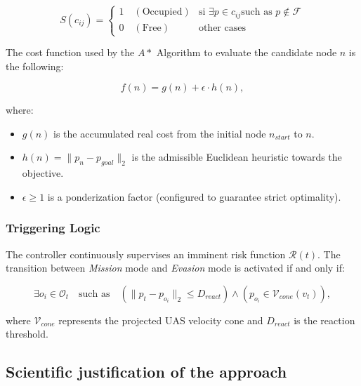 \documentclass[a4paper, 11pt]{article}
\begin{document}
\begin{equation}
    S(c_{ij}) = 
    \begin{cases} 
    1 \quad (\text{Occupied}) & \text{si } \exists p \in c_{ij} \text{such as } p \notin \mathcal{F} \\ 
    0 \quad (\text{Free}) & \text{other cases} 
    \end{cases}
\end{equation}

The cost function used by the $A*$ Algorithm to evaluate the candidate node $n$ is the following: 

\begin{equation}
    f(n) = g(n) + \epsilon \cdot h(n),
\end{equation}

where:
\begin{itemize}
    \item $g(n)$ is the accumulated real cost from the initial node $n_{start}$ to $n$.
    \item $h(n) = \| p_n - p_{goal} \|_2$ is the admissible Euclidean heuristic towards the objective. 
    \item $\epsilon \ge 1$ is a ponderization factor (configured to guarantee strict optimality).
\end{itemize}

\subsubsection{Triggering Logic}
The controller continuously supervises an imminent risk function $\mathcal{R}(t)$. The transition between \textit{Mission} mode and \textit{Evasion} mode is activated if and only if:

\begin{equation}
    \exists o_i \in \mathcal{O}_t \quad \text{such as} \quad (\| p_t - p_{o_i} \|_2 \le D_{react}) \land (p_{o_i} \in \mathcal{V}_{cone}(v_t)),
\end{equation}

where $\mathcal{V}_{cone}$ represents the projected UAS velocity cone and $D_{react}$ is the reaction threshold. %

\subsection{Scientific justification of the approach}
\end{document}

